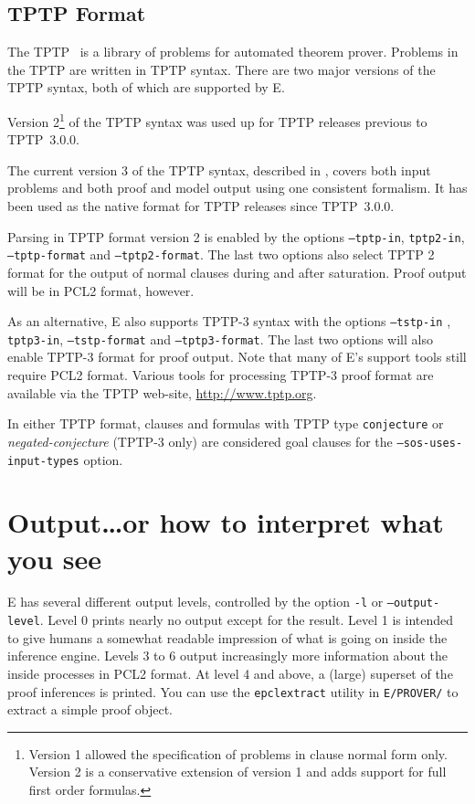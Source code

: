 \documentclass{article}
\begin{document}
\subsection{TPTP Format}

The TPTP~\cite{Sutcliffe:TPTP-WWW} is a library of problems for
automated theorem prover. Problems in the TPTP are written in TPTP
syntax. There are two major versions of the TPTP syntax, both of which
are supported by E.

Version 2\footnote{Version 1 allowed the specification of problems in
  clause normal form only. Version 2 is a conservative extension of
  version 1 and adds support for full first order formulas.} of the
TPTP syntax was used up for TPTP releases previous to TPTP~3.0.0.

The current version 3 of the TPTP syntax, described in \cite{GSCG:IJCAR-2006},
covers both input problems and both proof and model output using one
consistent formalism. It has been used as the native format for TPTP
releases since TPTP~3.0.0.

Parsing in TPTP format version 2 is enabled by the options
\texttt{--tptp-in}, \texttt{tptp2-in}, \texttt{--tptp-format} and
\texttt{--tptp2-format}. The last two options also select TPTP 2
format for the output of normal clauses during and after
saturation. Proof output will be in PCL2 format, however.

As an alternative, E also supports TPTP-3 syntax with the options
\texttt{--tstp-in} , \texttt{tptp3-in}, \texttt{--tstp-format} and
\texttt{--tptp3-format}. The last two options will also enable TPTP-3
format for proof output. Note that many of E's support tools still
require PCL2 format. Various tools for processing TPTP-3 proof format
are available via the TPTP web-site, \url{http://www.tptp.org}.

In either TPTP format, clauses and formulas with TPTP type
\texttt{conjecture} or \emph{negated-conjecture} (TPTP-3 only) are
considered goal clauses for the \texttt{--sos-uses-input-types}
option.



\section{Output\ldots or how to interpret what you see}
\label{sec:output}

E has several different output levels, controlled by the option
\texttt{-l} or \texttt{--output-level}. Level 0 prints nearly no
output except for the result. Level 1 is intended to give humans a
somewhat readable impression of what is going on inside the inference
engine.  Levels 3 to 6 output increasingly more information about the
inside processes in PCL2 format. At level 4 and above, a (large)
superset of the proof inferences is printed. You can use the
\texttt{epclextract} utility in \texttt{E/PROVER/} to extract a simple
proof object.
\end{document}

